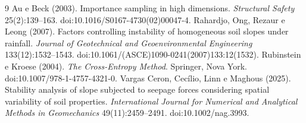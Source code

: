 \documentclass[11pt,a4paper]{article}
\begin{document}
\begin{thebibliography}{9}
 Au e Beck (2003). Importance sampling in high dimensions. \emph{Structural Safety} 25(2):139--163.
doi:10.1016/S0167-4730(02)00047-4.
 Rahardjo, Ong, Rezaur e Leong (2007). Factors controlling instability of homogeneous soil slopes
under rainfall. \emph{Journal of Geotechnical and Geoenvironmental Engineering} 133(12):1532--1543.
doi:10.1061/(ASCE)1090-0241(2007)133:12(1532).
 Rubinstein e Kroese (2004). \emph{The Cross-Entropy Method}. Springer, Nova York.
doi:10.1007/978-1-4757-4321-0.
 Vargas Ceron, Cecílio, Linn e Maghous (2025). Stability analysis of slope subjected to seepage forces
considering spatial variability of soil properties. \emph{International Journal for Numerical and Analytical Methods in
Geomechanics} 49(11):2459--2491. doi:10.1002/nag.3993.
\end{thebibliography}
\end{document}
